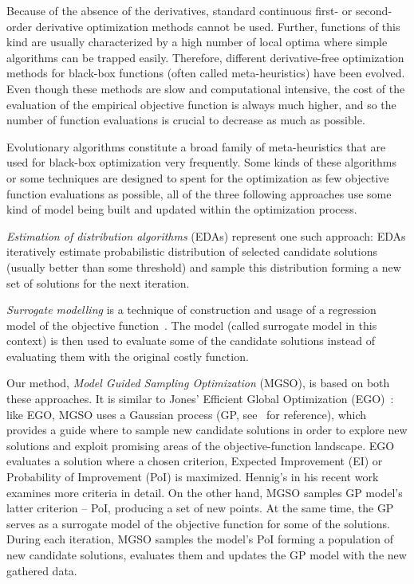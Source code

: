 \documentclass{itatnew}
\begin{document}
Because of the absence of the derivatives, standard continuous first- or second-order derivative optimization methods cannot be used. Further, functions of this kind are usually characterized by a high number of local optima where simple algorithms can be trapped easily. Therefore, different derivative-free optimization methods for black-box functions (often called meta-heuristics) have been evolved. Even though these methods are slow and computational intensive, the cost of the evaluation of the empirical objective function is always much higher, and so the number of function evaluations is crucial to decrease as much as possible.

Evolutionary algorithms constitute a broad family of meta-heuristics that are used for black-box optimization very frequently. Some kinds of these algorithms or some techniques are designed to spent for the optimization as few objective function evaluations as possible, all of the three following approaches use some kind of model being built and updated within the optimization process.

\emph{Estimation of distribution algorithms} (EDAs) \cite{larranaga_estimation_2002} represent one such approach: EDAs iteratively estimate probabilistic distribution of selected candidate solutions (usually better than some threshold) and sample this distribution forming a new set of solutions for the next iteration. 

\emph{Surrogate modelling} is a technique of construction and usage of a regression model of the objective function~\cite{jin_comprehensive_2005}. The model (called surrogate model in this context) is then used to evaluate some of the candidate solutions instead of evaluating them with the original costly function.

Our method, \emph{Model Guided Sampling Optimization} (MGSO), is based on both these approaches. It is similar to Jones' Efficient Global Optimization (EGO)~\cite{jones_efficient_1998}: like EGO, MGSO uses a Gaussian process (GP, see~\cite{rasmussen_gaussian_2006} for reference), which provides a guide where to sample new candidate solutions in order to explore new solutions and exploit promising areas of the objective-function landscape. EGO evaluates a solution where a chosen criterion, Expected Improvement (EI) or Probability of Improvement (PoI) is maximized. Hennig's in his recent work~\cite{hennig_entropy_2012} examines more criteria in detail. On the other hand, MGSO samples GP model's latter criterion -- PoI, producing a set of new points. At the same time, the GP serves as a surrogate model of the objective function for some of the solutions. During each iteration, MGSO samples the model's PoI forming a population of new candidate solutions, evaluates them and updates the GP model with the new gathered data.
\end{document}
